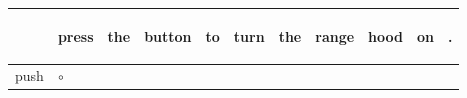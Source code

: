 \documentclass[landscape]{article}
\newcommand{\ssp}{\hspace{2pt}}
\newcommand{\map}{\cellcolor{y}$\boldsymbol\circ$}
\begin{document}
\noindent\begin{tabular}{|l|p{10pt}|p{10pt}|p{10pt}|p{10pt}|p{10pt}|p{10pt}|p{10pt}|p{10pt}|p{10pt}|p{10pt}|}
\hline
&\begin{sideways}\cellcolor{ref0}press\hspace{12pt}\end{sideways}&\begin{sideways}\cellcolor{ref1}the\hspace{12pt}\end{sideways}&\begin{sideways}\cellcolor{ref2}button\hspace{12pt}\end{sideways}&\begin{sideways}\cellcolor{ref3}to\hspace{12pt}\end{sideways}&\begin{sideways}\cellcolor{ref4}turn\hspace{12pt}\end{sideways}&\begin{sideways}\cellcolor{ref5}the\hspace{12pt}\end{sideways}&\begin{sideways}\cellcolor{ref6}range\hspace{12pt}\end{sideways}&\begin{sideways}\cellcolor{ref7}hood\hspace{12pt}\end{sideways}&\begin{sideways}\cellcolor{ref8}on\hspace{12pt}\end{sideways}&\begin{sideways}\cellcolor{ref9}.\hspace{12pt}\end{sideways}\\
\hline
\ssp \cellcolor{ref0}push \ssp&\hspace{2pt}\map&\hspace{2pt}&\hspace{2pt}&\hspace{2pt}&\hspace{2pt}&\hspace{2pt}&\hspace{2pt}&\hspace{2pt}&\hspace{2pt}&\hspace{2pt}\\

\end{tabular}
\end{document}
